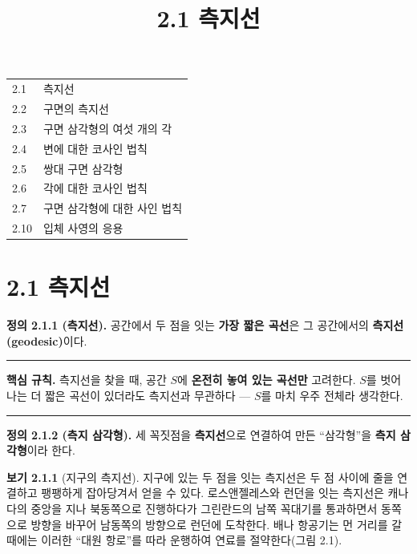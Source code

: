 \documentclass{article}
\title{2.1 측지선}
\date{}
\author{}
\begin{document}
\maketitle

\begin{tcolorbox}[colback=blue!5, colframe=blue!60!black,
  title=제 2 장\quad 구면 기하학 --- 한눈에 보기,
  boxrule=0.5mm, arc=3mm]
\begin{tabular}{@{}ll@{}}
2.1  & 측지선 \\
2.2  & 구면의 측지선 \\
2.3  & 구면 삼각형의 여섯 개의 각 \\
2.4  & 변에 대한 코사인 법칙 \\
2.5  & 쌍대 구면 삼각형 \\
2.6  & 각에 대한 코사인 법칙 \\
2.7  & 구면 삼각형에 대한 사인 법칙 \\
2.10 & 입체 사영의 응용 \\
\end{tabular}
\end{tcolorbox}

\section*{2.1 측지선}

\begin{tcolorbox}[
  colback=teal!4, colframe=teal!65!black,
  title=정의 \& 핵심 규칙,
  fonttitle=\bfseries, boxrule=0.5mm, arc=3mm]

\textbf{\textcolor{teal!65!black}{정의 2.1.1 (측지선).}}\quad
공간에서 두 점을 잇는 \textbf{가장 짧은 곡선}은 그 공간에서의 \textbf{측지선(geodesic)}이다.

\noindent\textcolor{teal!50!black}{\rule{\linewidth}{0.4pt}}

\textbf{\textcolor{teal!65!black}{핵심 규칙.}}\quad
측지선을 찾을 때, 공간 $S$에 \textbf{온전히 놓여 있는 곡선만} 고려한다.
$S$를 벗어나는 더 짧은 곡선이 있더라도 측지선과 무관하다 --- $S$를 마치 우주 전체라 생각한다.

\noindent\textcolor{teal!50!black}{\rule{\linewidth}{0.4pt}}

\textbf{\textcolor{teal!65!black}{정의 2.1.2 (측지 삼각형).}}\quad
세 꼭짓점을 \textbf{측지선}으로 연결하여 만든 ``삼각형''을 \textbf{측지 삼각형}이라 한다.

\end{tcolorbox}

\medskip
\textbf{보기 2.1.1} (지구의 측지선).\quad
지구에 있는 두 점을 잇는 측지선은 두 점 사이에 줄을 연결하고 팽팽하게 잡아당겨서 얻을 수 있다.
로스앤젤레스와 런던을 잇는 측지선은 캐나다의 중앙을 지나 북동쪽으로 진행하다가 그린란드의 남쪽 꼭대기를 통과하면서 동쪽으로 방향을 바꾸어 남동쪽의 방향으로 런던에 도착한다.
배나 항공기는 먼 거리를 갈 때에는 이러한 ``대원 항로''를 따라 운행하여 연료를 절약한다(그림 2.1).
\end{document}
